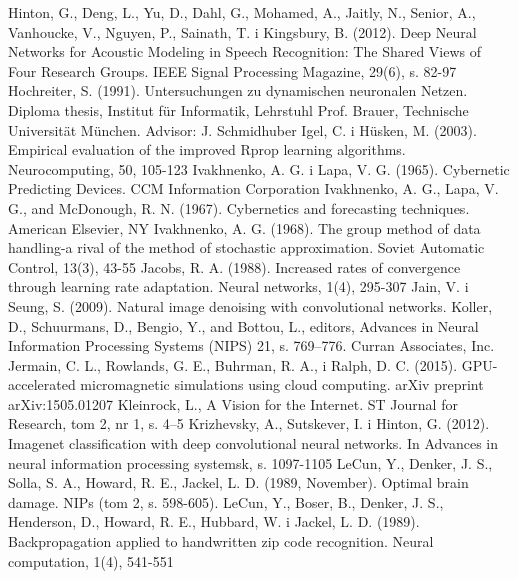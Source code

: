 \documentclass[12pt,a4paper,twoside]{article}
\begin{document}
\begin{thebibliography}{99}
 Hinton, G., Deng, L., Yu, D., Dahl, G., Mohamed, A., Jaitly, N., Senior, A., Vanhoucke, V., Nguyen, P., Sainath, T. i Kingsbury, B. (2012). Deep Neural Networks for Acoustic Modeling in Speech Recognition: The Shared Views of Four Research Groups. IEEE Signal Processing Magazine, 29(6), s. 82-97
 Hochreiter, S. (1991). Untersuchungen zu dynamischen neuronalen Netzen. Diploma thesis, Institut für Informatik, Lehrstuhl Prof. Brauer, Technische Universität München. Advisor: J. Schmidhuber
 Igel, C. i Hüsken, M. (2003). Empirical evaluation of the improved Rprop learning algorithms. Neurocomputing, 50, 105-123
 Ivakhnenko, A. G. i Lapa, V. G. (1965). Cybernetic Predicting Devices. CCM Information Corporation
 Ivakhnenko, A. G., Lapa, V. G., and McDonough, R. N. (1967). Cybernetics and forecasting techniques. American Elsevier, NY
 Ivakhnenko, A. G. (1968). The group method of data handling-a rival of the method of stochastic approximation. Soviet Automatic Control, 13(3), 43-55
 Jacobs, R. A. (1988). Increased rates of convergence through learning rate adaptation. Neural networks, 1(4), 295-307
 Jain, V. i Seung, S. (2009). Natural image denoising with convolutional networks. Koller, D., Schuurmans, D., Bengio, Y., and Bottou, L., editors, Advances in Neural Information Processing Systems (NIPS) 21, s. 769–776. Curran Associates, Inc.
 Jermain, C. L., Rowlands, G. E., Buhrman, R. A., i Ralph, D. C. (2015). GPU-accelerated micromagnetic simulations using cloud computing. arXiv preprint arXiv:1505.01207
 Kleinrock, L., A Vision for the Internet. ST Journal for Research, tom 2, nr 1, s. 4–5
 Krizhevsky, A., Sutskever, I. i Hinton, G. (2012). Imagenet classification with deep convolutional neural networks. In Advances in neural information processing systemsk, s. 1097-1105
 LeCun, Y., Denker, J. S., Solla, S. A., Howard, R. E., Jackel, L. D. (1989, November). Optimal brain damage. NIPs (tom 2, s. 598-605).
 LeCun, Y., Boser, B., Denker, J. S., Henderson, D., Howard, R. E., Hubbard, W. i Jackel, L. D. (1989). Backpropagation applied to handwritten zip code recognition. Neural computation, 1(4), 541-551

\end{thebibliography}
\end{document}
